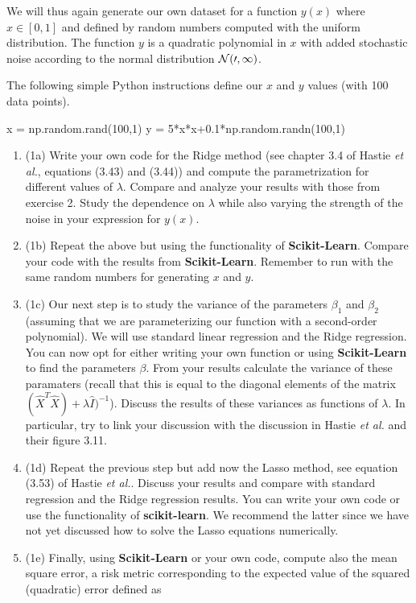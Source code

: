 \documentclass[%
oneside,                 %
final,                   %
10pt]{article}
\begin{document}
We will thus again generate our own dataset for a function $y(x)$ where 
$x \in [0,1]$ and defined by random numbers computed with the uniform
distribution. The function $y$ is a quadratic polynomial in $x$ with
added stochastic noise according to the normal distribution $\cal{N}(0,1)$.

The following simple Python instructions define our $x$ and $y$ values (with 100 data points).
\begin{print}
x = np.random.rand(100,1)
y = 5*x*x+0.1*np.random.randn(100,1)
\end{print}

\begin{enumerate}
\item (1a) Write your own code for the Ridge method (see chapter 3.4 of Hastie \emph{et al.}, equations (3.43) and (3.44)) and compute the parametrization for different values of $\lambda$. Compare and analyze your results with those from exercise 2. Study the dependence on $\lambda$ while also varying the strength of the noise in your expression for $y(x)$. 

\item (1b) Repeat the above but using the functionality of \textbf{Scikit-Learn}. Compare your code with the results from \textbf{Scikit-Learn}. Remember to run with the same random numbers for generating $x$ and $y$. 

\item (1c) Our next step is to study the variance of the parameters $\beta_1$ and $\beta_2$ (assuming that we are parameterizing our function with a second-order polynomial). We will use standard linear regression and the Ridge regression.  You can now opt for either writing your own function or using \textbf{Scikit-Learn} to find the parameters $\beta$. From your results calculate the variance of these paramaters (recall that this is equal to the diagonal elements of the matrix $(\hat{X}^T\hat{X})+\lambda\hat{I})^{-1}$). Discuss the results of these variances as functions of $\lambda$. In particular, try to link your discussion with the discussion in Hastie \emph{et al.} and their figure 3.11.

\item (1d) Repeat the previous step but add now the Lasso method, see equation (3.53) of Hastie \emph{et al.}. Discuss your results and compare with standard regression and the Ridge regression results. You can write your own code or use the functionality of \textbf{scikit-learn}.  We recommend the latter since we have not yet discussed how to solve the Lasso equations numerically.

\item (1e) Finally, using \textbf{Scikit-Learn} or your own code, compute also the mean square error, a risk metric corresponding to the expected value of the squared (quadratic) error defined as
\end{enumerate}
\end{document}
